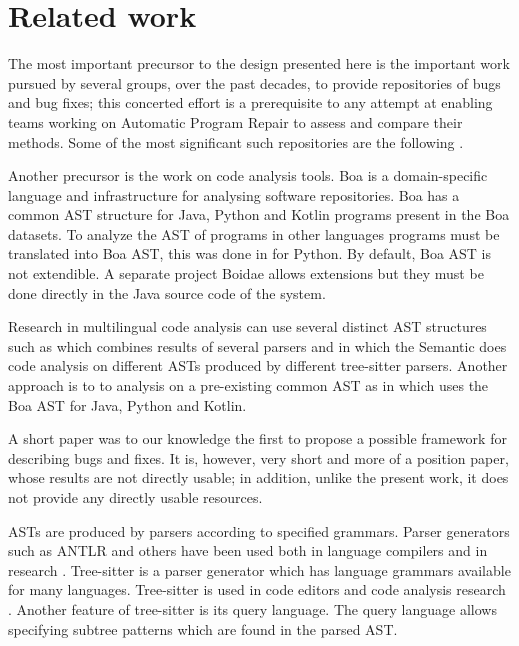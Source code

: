 \section{Related work}
\label{related_work}
The most important precursor to the design presented here is the important work
pursued by several groups, over the past decades, to provide repositories of
bugs and bug fixes; this concerted effort is a prerequisite to any attempt at
enabling teams working on Automatic Program Repair to assess and compare their
methods. Some of the most significant such repositories are the following \cite{campos2017common, soto2016deeper,livshits2005dynamine,williams2005automatic,sun2017empirical,duraes2006emulation,catolino2019not,lin2017quixbugs,sobreira2018dissection}.

Another precursor is the work on code analysis tools. Boa \cite{dyer2015boa} is a
domain-specific language and infrastructure for analysing software repositories.
Boa has a common AST structure for Java, Python and Kotlin programs present
in the Boa datasets. To analyze the AST of programs in other languages programs
must be translated into Boa AST, this was done in \cite{biswas2019boa} for
Python. By default, Boa AST is not extendible. A separate project Boidae
\cite{sigurdson2024boidae} allows extensions but they must be done directly
in the Java source code of the system.

Research in multilingual code analysis can use several distinct AST structures
such as \cite{nielebock2019programmers} which combines results
of several parsers and \cite{rix2024semantic,clem2021static}
in which the Semantic \cite{rix2024semantic} does code analysis on different
ASTs produced by different tree-sitter parsers.
Another approach is to to analysis on a pre-existing common AST as in
\cite{keshk2023method} which uses the Boa AST for Java, Python and Kotlin.

A short paper \cite{aprlisbon} was to our knowledge the first to propose a possible framework for describing bugs and fixes. It is, however, very short and more of a position paper, whose results are not directly usable; in addition, unlike the present work, it does not provide any directly usable resources.

ASTs are produced by parsers according to specified grammars. Parser generators
such as ANTLR \cite{parr1995antlr} and others have been used both in language compilers
and in research \cite{latif2023comparison}. Tree-sitter
\cite{tree-sitter} is a parser generator which has language grammars
available for many languages. Tree-sitter is used in code editors and code
analysis research \cite{le2022hyperast,nielebock2019programmers,clem2021static}.
Another feature of tree-sitter is its query language. The query language allows
specifying subtree patterns which are found in the parsed AST.
